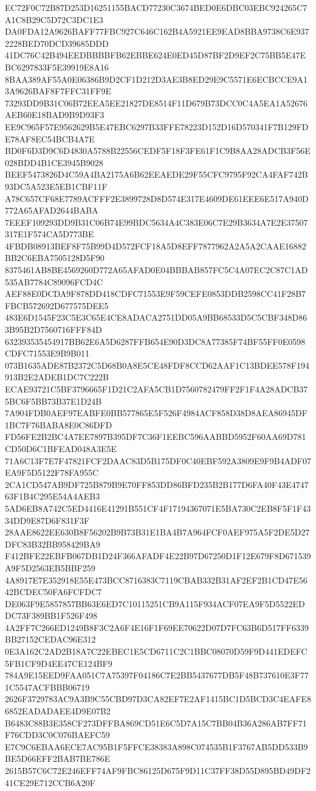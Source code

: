 {{EC72F0C72B87D253D16251155BACD77230C3674BED0E6DBC03EBC924265C7A1C8B29C5D72C3DC1E3
DA0FDA12A9626BAFF77FBC927C646C162B4A5921EE9EAD8BBA9738C6E9372228BED70DCD39685DDD
41DC76C42B494EEDBBBBFB62EBBE624E0ED45D87BF2D9EF2C75BB5E47EBC6297833F5E39919E8A16
8BAA389AF55A0E06386B9D2CF1D212D3AE3B8ED29E9C5571E6ECBCCE9A13A9626BAF8F7FFC31FF9E
73293DD9B31C06B72EEA5EE21827DE8514F11D679B73DCC0C4A5EA1A52676AEB60E18BAD9B9D93F3
EE9C965F57E9562629B5E47EBC6297B33FFE78223D152D16D570341F7B129FDE78AF8EC54BCB4A7E
BD0F6D3D9C6D4830A5788B22556CEDF5F18F3FE61F1C9B8AA28ADCB3F56E028BDD4B1CE3945B9028
BEEF5473826D4C59A4BA2175A6B62EEAEDE29F55CFC9795F92CA4FAF742B93DC5A523E5EB1CBF11F
A78C657CF68E7789ACFFF2E3899728D8D574E317E4609DE61EEE6E517A940D772A65AFAD2644BABA
7EEEF109293DD9B31C06B74E99BDC5634A4C383E06C7E29B3634A7E2E37507317E1F574CA5D773BE
4FBDB08913BEF8F75B99D4D572FCF18A5D8EFF7877962A2A5A2CAAE16882BB2C6EBA7505128D5F90
8375461AB8BE4569260D772A65AFAD0E04BBBAB857FC5C4A07EC2C87C1AD535AB7784C89096FCD4C
AEF88E0DCDA9F878DD418CDFC71553E9F59CEFE0853DDB2598CC41F28B7FBCB572692D677575DEE5
483E6D1545F23C5E3C65E4CE8ADACA2751DD05A9BB68533D5C5CBF348D863B95B2D7560716FFF84D
632393535454917BB62E6A5D6287FFB654E90D3DC8A77385F74BF55FF0E0598CDFC71553E9B9B011
073B1635ADE87B2372C5D68B0A8E5CE48FDF8CCD62AAF1C13BDEE578F194913B2E2ADEB1DC7C222B
ECAE93721C5BF3796665F1D21C2AFA5CB1D7560782479FF2F1F4A28ADCB375BC6F5BB73B37E1D24B
7A904FDB0AEF97EABFE0BB577865E5F526F4984ACF858D38D8AEA86945DF1BC7F76BABA8E0C86DFD
FD56FE2B2BC4A7EE7897B395DF7C36F1EEBC596AABBD5952F60AA69D781CD50D6C1BFEAD048A3E5E
71A6C13F7E7F47821FCF2DAAC83D5B175DF0C40EBF592A3809E9F9B4ADF07EA9F5D5122F78FA955C
2CA1CD547AB9DF725B879B9E70FF853DD86BFD235B2B177D6FA40F43E474763F1B4C295E54A4AEB3
5AD6EB8A742C5ED4416E41291B551CF4F17194367071E5BA730C2EB8F5F1F4334DD9E87D6F831F3F
28AAE8622EE630B8F56202B9B73B31E1BA4B7A964FCF0AEF975A5F2DE5D27DFC83B32BB958429BA9
F412BFE22EBFB067DB1D24F366AFADF4E22B97D67250D1F12E679F8D671539A9F5D2563EB5BBF259
4A8917E7E352918E55E473BCC8716383C7119CBAB332B31AF2EF2B1CD47E5642BCDEC50FA6FCFDC7
DE063F9E5857857BB63E6ED7C10115251CB9A115F934ACF07EA9F5D5522EDDC73F389BB1F526F498
4A2FF7C266ED1249B8F3C2A6F4E16F1F69EE70622D07D7FC63B6D517FF6339BB27152CEDAC96E312
0E3A162C2AD2B18A7C22EBEC1E5CD6711C2C1BBC08070D59F9D441EDEFC5FB1CF9D4EE47CE124BF9
784A9E15EED9FAA051C7A75397F04186C7E2BB5437677DB5F48B737610E3F771C5547ACFBBB06719
2626F3729783AC9A3B9C55CBD97D3CA82EF7E2AF1415BC1D5BCD3C4EAFE86852EADADAEE4D9E07B2
B6483C88B3E358CF273DFFBA869CD51E6C5D7A15C7BB04B36A286AB7FF71F76CDD3C0C076BAEFC59
E7C9C6EBAA6ECE7AC95B1F5FFCE38383A898C074535B1F3767AB5DD533B9BE5D66EFF2BAB7BE786E
2615B57C6C72E246EFF74AF9FBC86125D675F9D11C37FF38D55D895BD49DF241CE29E712CCB6A20F
}}
